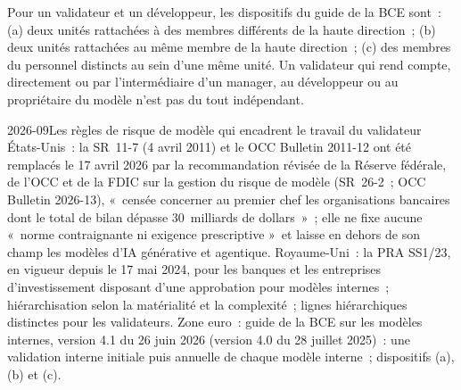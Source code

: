 \begin{definition}\label{def:in:bank-quant:arrangement}
Pour un validateur et un développeur, les dispositifs du guide de la BCE sont~: (a) deux unités rattachées à des membres
différents de la haute direction~; (b) deux unités rattachées au même membre de la haute direction~; (c) des membres du personnel distincts au sein d'une même unité.
Un validateur qui rend compte, directement ou par l'intermédiaire d'un manager, au développeur ou au propriétaire du modèle n'est pas du tout indépendant.
\end{definition}

\begin{dated}{2026-09}{Les règles de risque de modèle qui encadrent le travail du validateur}\label{dat:in:bank-quant:rules}
États-Unis~: la SR~11-7 (4 avril 2011) et le OCC Bulletin 2011-12 ont été remplacés le 17 avril 2026 par la recommandation révisée
de la Réserve fédérale, de l'OCC et de la FDIC sur la gestion du risque de modèle (SR~26-2~; OCC Bulletin 2026-13), «~censée
concerner au premier chef les organisations bancaires dont le total de bilan dépasse 30~milliards de dollars~»~; elle ne fixe aucune «~norme contraignante ni exigence prescriptive
»~et laisse en dehors de son champ les modèles d'IA générative et agentique. Royaume-Uni~: la PRA SS1/23, en vigueur depuis
le 17 mai 2024, pour les banques et les entreprises d'investissement disposant d'une approbation pour modèles internes~; hiérarchisation selon la matérialité et la complexité~; lignes hiérarchiques distinctes
pour les validateurs. Zone euro~: guide de la BCE sur les modèles internes, version 4.1 du 26 juin 2026 (version 4.0 du 28
juillet 2025)~: une validation interne initiale puis annuelle de chaque modèle interne~; dispositifs (a), (b) et (c).
\end{dated}

